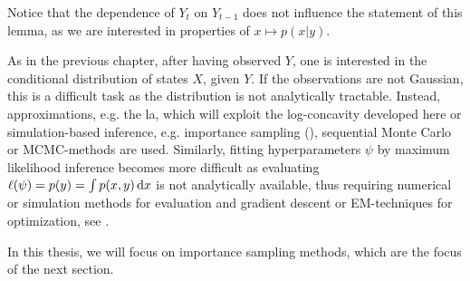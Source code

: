 Notice that the dependence of $Y_{t}$ on $Y_{t - 1}$ does not influence the statement of this lemma, as we are interested in properties of $x \mapsto p(x|y)$.

As in the previous chapter, after having observed $Y$, one is interested in the conditional distribution of states $X$, given $Y$. If the observations are not Gaussian, this is a difficult task as the distribution is not analytically tractable. Instead, approximations, e.g. the \gls{la}, which will exploit the log-concavity developed here or simulation-based inference, e.g. importance sampling (), sequential Monte Carlo \citep{Chopin2020Introduction} or MCMC-methods \citep{Brooks2011Handbook} are used. Similarly, fitting hyperparameters $\psi$ by maximum likelihood inference becomes more difficult as evaluating $\ell(\psi) = p(y) = \int p(x,y) \,\mathrm d x$ is not analytically available, thus requiring numerical or simulation methods for evaluation and gradient descent or EM-techniques for optimization, see .

In this thesis, we will focus on importance sampling methods, which are the focus of the next section.